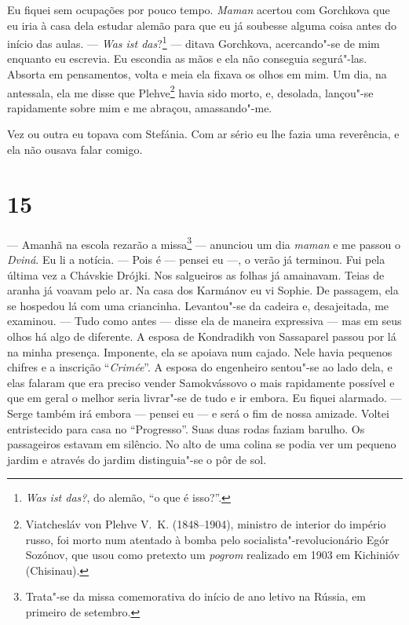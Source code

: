 Eu fiquei sem ocupações por pouco tempo. \emph{Maman} acertou com
Gorchkova que eu iria à casa dela estudar alemão para que eu já soubesse
alguma coisa antes do início das aulas. --- \emph{Was ist
das}?\footnote{\emph{Was ist das?}, do alemão, ``o que é isso?''.} ---
ditava Gorchkova, acercando"-se de mim enquanto eu escrevia. Eu escondia
as mãos e ela não conseguia segurá"-las. Absorta em pensamentos, volta e
meia ela fixava os olhos em mim. Um dia, na antessala, ela me disse que
Plehve\footnote{Viatchesláv von Plehve V.~K. (1848--1904), ministro de
  interior do império russo, foi morto num atentado à bomba pelo
  socialista"-revolucionário Egór Sozónov, que usou como pretexto um
  \emph{pogrom} realizado em 1903 em Kichinióv (Chisinau).} havia sido
morto, e, desolada, lançou"-se rapidamente sobre mim e me abraçou,
amassando"-me.

Vez ou outra eu topava com Stefánia. Com ar sério eu lhe fazia uma
reverência, e ela não ousava falar comigo.

\section{15}

--- Amanhã na escola rezarão a missa\footnote{Trata"-se da missa
  comemorativa do início de ano letivo na Rússia, em primeiro de
  setembro.} --- anunciou um dia \emph{maman} e me passou o
\emph{Dviná}. Eu li a notícia. --- Pois é --- pensei eu ---, o verão já
terminou. Fui pela última vez a Chávskie Drójki. Nos salgueiros as
folhas já amainavam. Teias de aranha já voavam pelo ar. Na casa dos
Karmánov eu vi Sophie. De passagem, ela se hospedou lá com uma
criancinha. Levantou"-se da cadeira e, desajeitada, me examinou. --- Tudo
como antes --- disse ela de maneira expressiva --- mas em seus olhos há
algo de diferente. A esposa de Kondradikh von Sassaparel passou por lá
na minha presença. Imponente, ela se apoiava num cajado. Nele havia
pequenos chifres e a inscrição ``\emph{Crimée}''. A esposa do engenheiro
sentou"-se ao lado dela, e elas falaram que era preciso vender
Samokvássovo o mais rapidamente possível e que em geral o melhor seria
livrar"-se de tudo e ir embora. Eu fiquei alarmado. --- Serge também irá
embora --- pensei eu --- e será o fim de nossa amizade. Voltei
entristecido para casa no ``Progresso''. Suas duas rodas faziam barulho.
Os passageiros estavam em silêncio. No alto de uma colina se podia ver
um pequeno jardim e através do jardim distinguia"-se o pôr de sol.%

